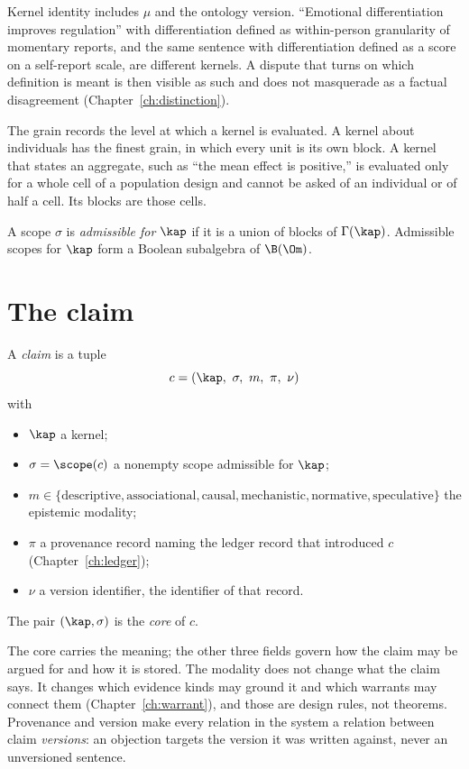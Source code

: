 Kernel identity includes $\mu$ and the ontology version. ``Emotional differentiation improves regulation'' with differentiation defined as within-person granularity of momentary reports, and the same sentence with differentiation defined as a score on a self-report scale, are different kernels. A dispute that turns on which definition is meant is then visible as such and does not masquerade as a factual disagreement (Chapter~\ref{ch:distinction}).

The grain records the level at which a kernel is evaluated. A kernel about individuals has the finest grain, in which every unit is its own block. A kernel that states an aggregate, such as ``the mean effect is positive,'' is evaluated only for a whole cell of a population design and cannot be asked of an individual or of half a cell. Its blocks are those cells.

\begin{definition}
A scope $\sigma$ is \emph{admissible for} $\kap$ if it is a union of blocks of $\Gamma(\kap)$. Admissible scopes for $\kap$ form a Boolean subalgebra of $\B(\Om)$.
\end{definition}

\section{The claim}

\begin{definition}[Claim]\label{def:claim}
A \emph{claim} is a tuple
\[
c=(\kap,\ \sigma,\ m,\ \pi,\ \nu)
\]
with
\begin{itemize}
\item $\kap$ a kernel;
\item $\sigma=\scope(c)$ a nonempty scope admissible for $\kap$;
\item $m\in\{\text{descriptive},\text{associational},\text{causal},\text{mechanistic},\text{normative},\text{speculative}\}$ the epistemic modality;
\item $\pi$ a provenance record naming the ledger record that introduced $c$ (Chapter~\ref{ch:ledger});
\item $\nu$ a version identifier, the identifier of that record.
\end{itemize}
The pair $(\kap,\sigma)$ is the \emph{core} of $c$.
\end{definition}

The core carries the meaning; the other three fields govern how the claim may be argued for and how it is stored. The modality does not change what the claim says. It changes which evidence kinds may ground it and which warrants may connect them (Chapter~\ref{ch:warrant}), and those are design rules, not theorems. Provenance and version make every relation in the system a relation between claim \emph{versions}: an objection targets the version it was written against, never an unversioned sentence.
